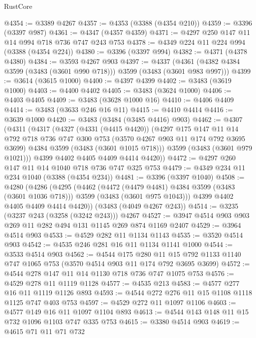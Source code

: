 \begin{lexlean}{RustCore}
\begin{coremodule}
@4354 := @3389 @4267
@4357 := @4353 (@3388 (@4354 @210))
@4359 := @3396 (@3397 @987)
@4361 := @4347 (@4357 @4359)
@4371 := @4297 @250 @147 @11 @14 @994 @718 @736 @747 @243 @753
@4378 := @4349 @224 @11 @224 @994 (@3388 (@4354 @224))
@4380 := @3396 (@3397 @994)
@4382 := @4371 (@4378 @4380)
@4384 := @3593 @4267 @903
@4397 := @4337 (@4361 (@4382 @4384 @3599 (@3483 (@3601 @990 @718))) @3599 (@3483 (@3601 @983 @997)))
@4399 := @3614 (@3615 @1000)
@4400 := @4397 @4399
@4402 := @3483 (@3619 @1000)
@4403 := @4400 @4402
@4405 := @3483 (@3624 @1000)
@4406 := @4403 @4405
@4409 := @3483 (@3628 @1000 @16)
@4410 := @4406 @4409
@4414 := @3483 (@3633 @246 @16 @11)
@4415 := @4410 @4414
@4416 := @3639 @1000
@4420 := @3483 (@3484 (@3485 @4416) @903)
@4462 := @4307
    (@4311
      (@4317
        (@4327
          (@4331 (@4415 @4420))
          (@4297
            @175
            @147
            @11
            @14
            @792
            @718
            @736
            @747
            @300
            @753
            (@3570 @4267 @903 @11 @174 @792 @3695 @3699)
            @4384
            @3599
            (@3483 (@3601 @1015 @718)))
          @3599
          (@3483 (@3601 @979 @1021)))
        @4399
        @4402
        @4405
        @4409
        @4414
        @4420))
@4472 := @4297 @260 @147 @11 @14 @1040 @718 @736 @747 @325 @753
@4479 := @4349 @234 @11 @234 @1040 (@3388 (@4354 @234))
@4481 := @3396 (@3397 @1040)
@4508 := @4280
    (@4286
      (@4295
        (@4462
          (@4472 (@4479 @4481) @4384 @3599 (@3483 (@3601 @1036 @718)))
          @3599
          (@3483 (@3601 @975 @1043)))
        @4399
        @4402
        @4405
        @4409
        @4414
        @4420))
    (@3483 (@4049 @4267 @243))
@4514 := @3235 (@3237 @243 (@3258 (@3242 @243))) @4267
@4527 := @3947 @4514 @903 @903 @269 @11 @282 @494 @131 @1145 @269 @874 @1169 @2407
@4529 := @3964 @4514 @903
@4533 := @4529 @282 @11 @1134 @1143
@4535 := @3520 @4514 @903
@4542 := @4535 @246 @281 @16 @11 @1134 @1141 @1000
@4544 := @3533 @4514 @903
@4562 := @4544
    @175
    @280
    @11
    @15
    @792
    @1133
    @1140
    @747
    @1065
    @753
    (@3570 @4514 @903 @11 @174 @792 @3695 @3699)
@4572 := @4544 @278 @147 @11 @14 @1130 @718 @736 @747 @1075 @753
@4576 := @4529 @278 @11 @1119 @1128
@4577 := @4535 @213
@4583 := @4577 @277 @16 @11 @1119 @1126 @893
@4593 := @4544 @272 @276 @11 @15 @1108 @1118 @1125 @747 @403 @753
@4597 := @4529 @272 @11 @1097 @1106
@4603 := @4577 @149 @16 @11 @1097 @1104 @893
@4613 := @4544 @143 @148 @11 @15 @732 @1096 @1103 @747 @335 @753
@4615 := @3380 @4514 @903
@4619 := @4615 @71 @11 @71 @732

\end{coremodule}
\end{lexlean}

